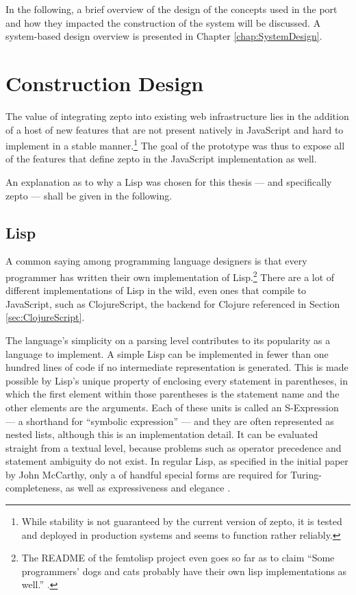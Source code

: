 \documentclass[oneside,11pt,xetex]{scrbook}
\begin{document}
In the following, a brief overview of the design of the concepts used
in the port and how they impacted the construction of the system will be
discussed. A system-based design overview is presented in Chapter \ref{chap:SystemDesign}.

\section{Construction Design}
\label{sec:ConstructionDesign}

The value of integrating zepto into existing web infrastructure lies in
the addition of a host of new features that are not present natively in
JavaScript and hard to implement in a stable manner.\footnote{While stability
is not guaranteed by the current version of zepto, it is tested and deployed
in production systems and seems to function rather reliably.}  The goal of
the prototype was thus to expose all of the features that define zepto in
the JavaScript implementation as well.

An explanation as to why a Lisp was chosen for this thesis --- and specifically
zepto --- shall be given in the following.

\subsection{Lisp}

A common saying among programming language designers is that every programmer has written
their own implementation of Lisp.\footnote{The README of the femtolisp project even goes so
far as to claim ``Some programmers' dogs and cats probably have their own lisp implementations
as well.'' \parencite{BEZL}.} There are a lot of different implementations of Lisp
in the wild, even ones that compile to JavaScript, such as ClojureScript, the
backend for Clojure referenced in Section \ref{sec:ClojureScript}.

The language's simplicity on a parsing level contributes to its popularity as
a language to implement.
A simple Lisp can be implemented in fewer than one hundred lines of code if no
intermediate representation is generated. This is made possible by Lisp's unique property
of enclosing every statement in parentheses, in which the first element within
those parentheses is the statement name and the other elements are the arguments.
Each of these units is called an S-Expression --- a shorthand for ``symbolic expression'' ---
and they are often represented as nested lists, although this is an implementation detail.
It can be evaluated straight from a textual level, because problems such as operator precedence
and statement ambiguity do not exist. In regular Lisp, as specified in the initial paper by
John McCarthy, only a of handful special forms are required for Turing-completeness, as well
as expressiveness and elegance \parencite{JCM}.
\end{document}
